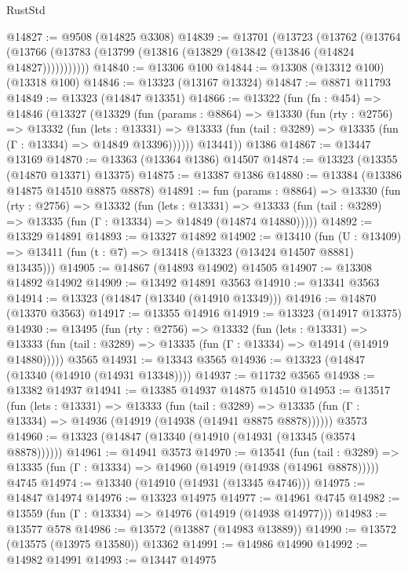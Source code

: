 \begin{lexlean}{RustStd}
\begin{coremodule}
@14827 := @9508 (@14825 @3308)
@14839 := @13701
    (@13723
      (@13762
        (@13764 (@13766 (@13783 (@13799 (@13816 (@13829 (@13842 (@13846 (@14824 @14827)))))))))))
@14840 := @13306 @100
@14844 := @13308 (@13312 @100) (@13318 @100)
@14846 := @13323 (@13167 @13324)
@14847 := @8871 @11793
@14849 := @13323 (@14847 @13351)
@14866 := @13322
    (fun (fn : @454) =>
    @14846
      (@13327
        (@13329
          (fun (params : @8864) =>
          @13330
            (fun (rty : @2756) =>
            @13332
              (fun (lets : @13331) =>
              @13333 (fun (tail : @3289) => @13335 (fun (Γ : @13334) => @14849 @13396))))))
        @13441))
    @1386
@14867 := @13447 @13169
@14870 := @13363 (@13364 @1386) @14507
@14874 := @13323 (@13355 (@14870 @13371) @13375)
@14875 := @13387 @1386
@14880 := @13384 (@13386 @14875 @14510 @8875 @8878)
@14891 := fun (params : @8864) =>
  @13330
    (fun (rty : @2756) =>
    @13332
      (fun (lets : @13331) =>
      @13333 (fun (tail : @3289) => @13335 (fun (Γ : @13334) => @14849 (@14874 @14880)))))
@14892 := @13329 @14891
@14893 := @13327 @14892
@14902 := @13410
    (fun (U : @13409) => @13411 (fun (t : @7) => @13418 (@13323 (@13424 @14507 @8881) @13435)))
@14905 := @14867 (@14893 @14902) @14505
@14907 := @13308 @14892 @14902
@14909 := @13492 @14891 @3563
@14910 := @13341 @3563
@14914 := @13323 (@14847 (@13340 (@14910 @13349)))
@14916 := @14870 (@13370 @3563)
@14917 := @13355 @14916
@14919 := @13323 (@14917 @13375)
@14930 := @13495
    (fun (rty : @2756) =>
    @13332
      (fun (lets : @13331) =>
      @13333 (fun (tail : @3289) => @13335 (fun (Γ : @13334) => @14914 (@14919 @14880)))))
    @3565
@14931 := @13343 @3565
@14936 := @13323 (@14847 (@13340 (@14910 (@14931 @13348))))
@14937 := @11732 @3565
@14938 := @13382 @14937
@14941 := @13385 @14937 @14875 @14510
@14953 := @13517
    (fun (lets : @13331) =>
    @13333
      (fun (tail : @3289) =>
      @13335 (fun (Γ : @13334) => @14936 (@14919 (@14938 (@14941 @8875 @8878))))))
    @3573
@14960 := @13323 (@14847 (@13340 (@14910 (@14931 (@13345 (@3574 @8878))))))
@14961 := @14941 @3573
@14970 := @13541
    (fun (tail : @3289) => @13335 (fun (Γ : @13334) => @14960 (@14919 (@14938 (@14961 @8878)))))
    @4745
@14974 := @13340 (@14910 (@14931 (@13345 @4746)))
@14975 := @14847 @14974
@14976 := @13323 @14975
@14977 := @14961 @4745
@14982 := @13559 (fun (Γ : @13334) => @14976 (@14919 (@14938 @14977)))
@14983 := @13577 @578
@14986 := @13572 (@13887 (@14983 @13889))
@14990 := @13572 (@13575 (@13975 @13580)) @13362
@14991 := @14986 @14990
@14992 := @14982 @14991
@14993 := @13447 @14975

\end{coremodule}
\end{lexlean}
